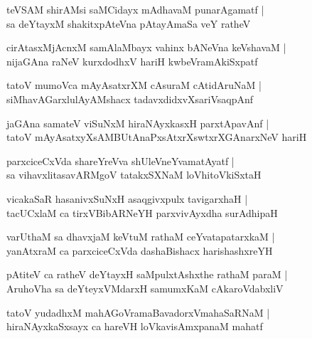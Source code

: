 \documentclass[twoside,12pt,openright]{book}
\newcounter{shloka}[chapter]
\begin{document}
\begin{shloka}%
teVSAM shirAMsi saMCidayx mAdhavaM punarAgamatf |\\
sa deYtayxM shakitxpAteVna pAtayAmaSa veY ratheV 
\end{shloka}

\begin{shloka}%
cirAtasxMjAcnxM samAlaMbayx vahinx bANeVna keVshavaM |\\
nijaGAna raNeV kurxdodhxV hariH kwbeVramAkiSxpatf
\end{shloka}

\begin{shloka}%
tatoV mumoVca mAyAsatxrXM cAsuraM cAtidAruNaM |\\
siMhavAGarxlulAyAMshacx tadavxdidxvXsariVsaqpAnf 
\end{shloka}

\begin{shloka}%
jaGAna samateV viSuNxM hiraNAyxkasxH parxtApavAnf |\\
tatoV mAyAsatxyXsAMBUtAnaPxsAtxrXswtxrXGAnarxNeV hariH 
\end{shloka}

\begin{shloka}%
parxciceCxVda shareYreVva shUleVneYvamatAyatf |\\
sa vihavxlitasavARMgoV tatakxSXNaM loVhitoVkiSxtaH 
\end{shloka}

\begin{shloka}%
vicakaSaR hasanivxSuNxH asaqgivxpulx tavigarxhaH |\\
tacUCxlaM ca tirxVBibARNeYH parxvivAyxdha surAdhipaH
\end{shloka}

\begin{shloka}%
varUthaM sa dhavxjaM keVtuM rathaM ceYvatapatarxkaM |\\
yanAtxraM ca parxciceCxVda dashaBishacx harishashxreYH
\end{shloka}

\begin{shloka}%
pAtiteV ca ratheV deYtayxH saMpulxtAshxthe rathaM paraM |\\
AruhoVha sa deYteyxVMdarxH samumxKaM cAkaroVdabxliV
\end{shloka}

\begin{shloka}%
tatoV yudadhxM mahAGoVramaBavadorxVmahaSaRNaM |\\
hiraNAyxkaSxsayx ca hareVH loVkavisAmxpanaM mahatf 
\end{shloka}
\end{document}
